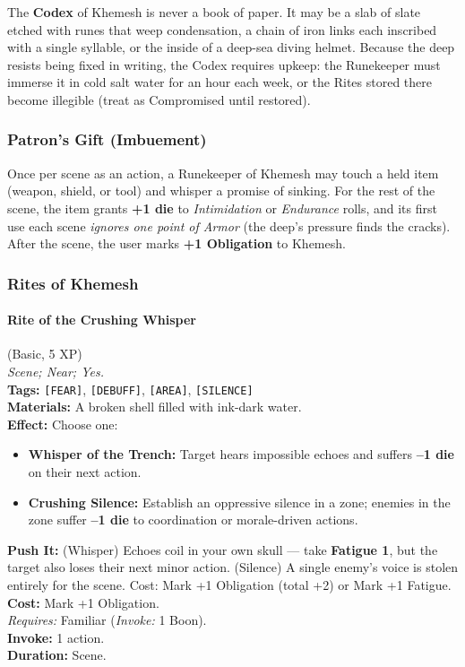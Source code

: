 The \textbf{Codex} of Khemesh is never a book of paper. It may be a slab of slate etched with runes that weep condensation, a chain of iron links each inscribed with a single syllable, or the inside of a deep-sea diving helmet. Because the deep resists being fixed in writing, the Codex requires upkeep: the Runekeeper must immerse it in cold salt water for an hour each week, or the Rites stored there become illegible (treat as Compromised until restored).

\subsubsection*{Patron's Gift (Imbuement)}

Once per scene as an action, a Runekeeper of Khemesh may touch a held item (weapon, shield, or tool) and whisper a promise of sinking. For the rest of the scene, the item grants \textbf{+1 die} to \textit{Intimidation} or \textit{Endurance} rolls, and its first use each scene \textit{ignores one point of Armor} (the deep's pressure finds the cracks). After the scene, the user marks \textbf{+1 Obligation} to Khemesh.

\subsubsection*{Rites of Khemesh}

\paragraph{Rite of the Crushing Whisper} (Basic, 5 XP) \hfill \\
\emph{Scene; Near; Yes.} \\
\textbf{Tags:} \texttt{[FEAR]}, \texttt{[DEBUFF]}, \texttt{[AREA]}, \texttt{[SILENCE]} \\
\textbf{Materials:} A broken shell filled with ink-dark water. \\
\textbf{Effect:} Choose one:
\begin{itemize}
  \item \textbf{Whisper of the Trench:} Target hears impossible echoes and suffers \textbf{--1 die} on their next action.
  \item \textbf{Crushing Silence:} Establish an oppressive silence in a zone; enemies in the zone suffer \textbf{--1 die} to coordination or morale-driven actions.
\end{itemize}
\textbf{Push It:} (Whisper) Echoes coil in your own skull --- take \textbf{Fatigue 1}, but the target also loses their next minor action. (Silence) A single enemy's voice is stolen entirely for the scene. Cost: Mark +1 Obligation (total +2) or Mark +1 Fatigue. \\
\textbf{Cost:} Mark +1 Obligation. \\
\textit{Requires:} Familiar (\textit{Invoke:} 1 Boon). \\
\textbf{Invoke:} 1 action. \\
\textbf{Duration:} Scene.

